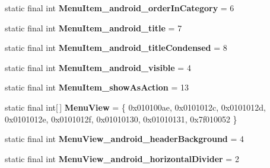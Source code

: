 \begin{DoxyCompactItemize}
\item 
\hypertarget{classandroid_1_1support_1_1design_1_1_r_1_1styleable_adb952108c9ed0399e3bcf2e3cce497d4}{}static final int {\bfseries Menu\+Item\+\_\+android\+\_\+order\+In\+Category} = 6\label{classandroid_1_1support_1_1design_1_1_r_1_1styleable_adb952108c9ed0399e3bcf2e3cce497d4}

\item 
\hypertarget{classandroid_1_1support_1_1design_1_1_r_1_1styleable_a8266068ad0815309f30d5f35e16bfb2f}{}static final int {\bfseries Menu\+Item\+\_\+android\+\_\+title} = 7\label{classandroid_1_1support_1_1design_1_1_r_1_1styleable_a8266068ad0815309f30d5f35e16bfb2f}

\item 
\hypertarget{classandroid_1_1support_1_1design_1_1_r_1_1styleable_aa3a614a548134feabb3f1a9e31eac7f0}{}static final int {\bfseries Menu\+Item\+\_\+android\+\_\+title\+Condensed} = 8\label{classandroid_1_1support_1_1design_1_1_r_1_1styleable_aa3a614a548134feabb3f1a9e31eac7f0}

\item 
\hypertarget{classandroid_1_1support_1_1design_1_1_r_1_1styleable_a486cad97abff8c88928c986faf3eee69}{}static final int {\bfseries Menu\+Item\+\_\+android\+\_\+visible} = 4\label{classandroid_1_1support_1_1design_1_1_r_1_1styleable_a486cad97abff8c88928c986faf3eee69}

\item 
\hypertarget{classandroid_1_1support_1_1design_1_1_r_1_1styleable_a9228bf5ad0fd30f0f56bd75d963d21c7}{}static final int {\bfseries Menu\+Item\+\_\+show\+As\+Action} = 13\label{classandroid_1_1support_1_1design_1_1_r_1_1styleable_a9228bf5ad0fd30f0f56bd75d963d21c7}

\item 
\hypertarget{classandroid_1_1support_1_1design_1_1_r_1_1styleable_acaf80b4eb554eab1b6f3b7f929ac7039}{}static final int\mbox{[}$\,$\mbox{]} {\bfseries Menu\+View} = \{ 0x010100ae, 0x0101012c, 0x0101012d, 0x0101012e, 0x0101012f, 0x01010130, 0x01010131, 0x7f010052 \}\label{classandroid_1_1support_1_1design_1_1_r_1_1styleable_acaf80b4eb554eab1b6f3b7f929ac7039}

\item 
\hypertarget{classandroid_1_1support_1_1design_1_1_r_1_1styleable_a6b1adf92334f4d846399c03132c5ea81}{}static final int {\bfseries Menu\+View\+\_\+android\+\_\+header\+Background} = 4\label{classandroid_1_1support_1_1design_1_1_r_1_1styleable_a6b1adf92334f4d846399c03132c5ea81}

\item 
\hypertarget{classandroid_1_1support_1_1design_1_1_r_1_1styleable_a479d3dd424d384893ed17a0c1d15c413}{}static final int {\bfseries Menu\+View\+\_\+android\+\_\+horizontal\+Divider} = 2\label{classandroid_1_1support_1_1design_1_1_r_1_1styleable_a479d3dd424d384893ed17a0c1d15c413}


\end{DoxyCompactItemize}
